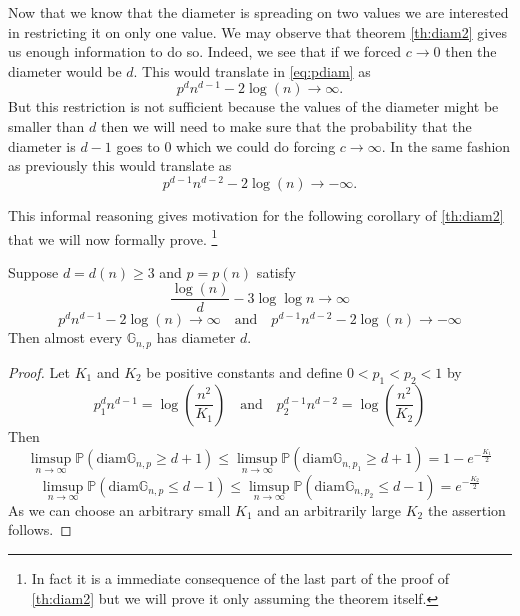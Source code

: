 Now that we know that the diameter is spreading on two values we are interested in restricting it on only one value. 
We may observe that theorem \eqref{th:diam2} gives us enough information to do so.
Indeed, we see that if we forced $c \to 0$ then the diameter would be $d$. This would translate in \eqref{eq:pdiam} as
\begin{equation}
	p^dn^{d-1} - 2\log(n) \longrightarrow \infty.
\end{equation}
But this restriction is not sufficient because the values of the diameter might be smaller than $d$ then we will need to make sure that the probability that the diameter is $d-1$ goes to 0 which we could do forcing $c \to \infty$.
In the same fashion as previously this would translate as
\begin{equation}
	p^{d-1}n^{d-2} - 2 \log(n) \longrightarrow -\infty.
\end{equation}

This informal reasoning gives motivation for the following corollary of \eqref{th:diam2} that we will now formally prove. 
\footnote{In fact it is a immediate consequence of the last part of the proof of \eqref{th:diam2} but we will prove it only assuming the theorem itself.}
\begin{corollary}\label{th:aediam}
	Suppose $d = d(n) \geq 3$ and $p = p(n)$ satisfy
	\begin{equation}
		\frac{\log(n)}{d} - 3\log\log n \to \infty
	\end{equation}
	\begin{equation}
		p^dn^{d-1} - 2\log(n) \longrightarrow \infty \quad \text{and} \quad
		p^{d-1}n^{d-2} - 2 \log(n) \longrightarrow -\infty
	\end{equation}
	Then almost every $\mathbb{G}_{n,p}$ has diameter $d$.
\end{corollary}
\begin{proof}
	Let $K_1$ and $K_2$ be positive constants and define $0<p_1<p_2<1$ by
	\begin{equation}
	p_1^{d}n^{d-1} = \log(\frac{n^2}{K_1})	\quad \text{and} \quad 	p_2^{d-1}n^{d-2} = \log(\frac{n^2}{K_2}) 
	\end{equation}
	Then 
	\begin{equation}
		\limsup_{n \to \infty} \mathbb{P}(\text{diam}\mathbb{G}_{n,p} \geq d+1 )
		\leq  \limsup_{n \to \infty} \mathbb{P}(\text{diam}\mathbb{G}_{n,p_1} \geq d+1 ) = 1 - e^{-\frac{K_1}{2}}
	\end{equation}
	\begin{equation}
		\limsup_{n \to \infty} \mathbb{P}(\text{diam}\mathbb{G}_{n,p} \leq d-1 )
		\leq  \limsup_{n \to \infty} \mathbb{P}(\text{diam}\mathbb{G}_{n,p_2} \leq d-1 ) = e^{-\frac{K_2}{2}}
	\end{equation}
	As we can choose an arbitrary small $K_1$ and an arbitrarily large $K_2$ the assertion follows.
\end{proof}


